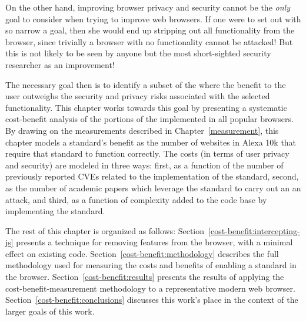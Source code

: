 On the other hand, improving browser privacy and security cannot be the \textit{only}
goal to consider when trying to improve web browsers.  If one were to set out
with so narrow a goal, then she would end up stripping out all functionality from
the browser, since trivially a browser with no functionality cannot be attacked!
But this is not likely to be seen by anyone but the most short-sighted security
researcher as an improvement!

The necessary goal then is to identify a subset of the \WAPI where the benefit
to the user outweighs the security and privacy risks associated with the
selected functionality.  This chapter works towards this goal by presenting a
systematic cost-benefit analysis of the portions of the \WAPI implemented in all
popular browsers.  By drawing on the measurements described in Chapter~\ref{measurement},
this chapter models a standard's benefit as the number of websites in
Alexa 10k that require that standard to function correctly.  The costs (in
terms of user privacy and security) are modeled in three ways: first, as a function of the
number of previously reported CVEs related to the implementation of the standard,
second, as the number of academic papers which leverage the standard to carry
out an an attack, and third, as a function of complexity added to the code base
by implementing the standard.

The rest of this chapter is organized as follows: Section~\ref{cost-benefit:intercepting-js}
presents a technique for removing \WAPI features from the browser, with
a minimal effect on existing code.  Section~\ref{cost-benefit:methodology}
describes the full methodology used for measuring the costs and benefits of
enabling a \WAPI standard in the browser.  Section~\ref{cost-benefit:results}
presents the results of applying the cost-benefit-measurement methodology to a
representative modern web browser.  Section~\ref{cost-benefit:conclusions} discusses
this work's place in the context of the larger goals of this work.
